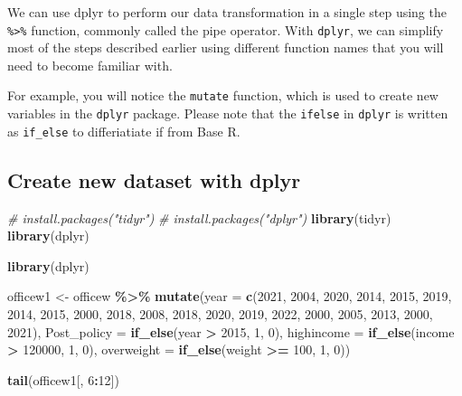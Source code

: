 \documentclass[
]{article}
\newenvironment{Shaded}{\begin{snugshade}}{\end{snugshade}}
\newcommand{\AttributeTok}[1]{\textcolor[rgb]{0.13,0.29,0.53}{#1}}
\newcommand{\CommentTok}[1]{\textcolor[rgb]{0.56,0.35,0.01}{\textit{#1}}}
\newcommand{\DecValTok}[1]{\textcolor[rgb]{0.00,0.00,0.81}{#1}}
\newcommand{\FunctionTok}[1]{\textcolor[rgb]{0.13,0.29,0.53}{\textbf{#1}}}
\newcommand{\NormalTok}[1]{#1}
\newcommand{\OtherTok}[1]{\textcolor[rgb]{0.56,0.35,0.01}{#1}}
\newcommand{\SpecialCharTok}[1]{\textcolor[rgb]{0.81,0.36,0.00}{\textbf{#1}}}
\begin{document}
We can use dplyr to perform our data transformation in a single step
using the \texttt{\%\textgreater{}\%} function, commonly called the pipe
operator. With \texttt{dplyr}, we can simplify most of the steps
described earlier using different function names that you will need to
become familiar with.

For example, you will notice the \texttt{mutate} function, which is used
to create new variables in the \texttt{dplyr} package. Please note that
the \texttt{ifelse} in \texttt{dplyr} is written as \texttt{if\_else} to
differiatiate if from Base R.

\hypertarget{create-new-dataset-with-dplyr}{%
\subsection{Create new dataset with
dplyr}\label{create-new-dataset-with-dplyr}}

\begin{Shaded}
\begin{Highlighting}[]
\CommentTok{\# install.packages("tidyr")}
\CommentTok{\# install.packages("dplyr")}
\FunctionTok{library}\NormalTok{(tidyr)}
\FunctionTok{library}\NormalTok{(dplyr)}

\FunctionTok{library}\NormalTok{(dplyr)}

\NormalTok{officew1 }\OtherTok{\textless{}{-}}\NormalTok{ officew }\SpecialCharTok{\%\textgreater{}\%}
  \FunctionTok{mutate}\NormalTok{(}\AttributeTok{year =} \FunctionTok{c}\NormalTok{(}\DecValTok{2021}\NormalTok{, }\DecValTok{2004}\NormalTok{, }\DecValTok{2020}\NormalTok{, }\DecValTok{2014}\NormalTok{, }\DecValTok{2015}\NormalTok{, }\DecValTok{2019}\NormalTok{, }\DecValTok{2014}\NormalTok{, }\DecValTok{2015}\NormalTok{, }\DecValTok{2000}\NormalTok{, }\DecValTok{2018}\NormalTok{, }
                  \DecValTok{2008}\NormalTok{, }\DecValTok{2018}\NormalTok{, }\DecValTok{2020}\NormalTok{, }\DecValTok{2019}\NormalTok{, }\DecValTok{2022}\NormalTok{, }\DecValTok{2000}\NormalTok{, }\DecValTok{2005}\NormalTok{, }\DecValTok{2013}\NormalTok{, }\DecValTok{2000}\NormalTok{, }\DecValTok{2021}\NormalTok{),}
         \AttributeTok{Post\_policy =} \FunctionTok{if\_else}\NormalTok{(year }\SpecialCharTok{\textgreater{}} \DecValTok{2015}\NormalTok{, }\DecValTok{1}\NormalTok{, }\DecValTok{0}\NormalTok{),}
         \AttributeTok{highincome =} \FunctionTok{if\_else}\NormalTok{(income }\SpecialCharTok{\textgreater{}} \DecValTok{120000}\NormalTok{, }\DecValTok{1}\NormalTok{, }\DecValTok{0}\NormalTok{),}
         \AttributeTok{overweight =} \FunctionTok{if\_else}\NormalTok{(weight }\SpecialCharTok{\textgreater{}=} \DecValTok{100}\NormalTok{, }\DecValTok{1}\NormalTok{, }\DecValTok{0}\NormalTok{))}


\FunctionTok{tail}\NormalTok{(officew1[, }\DecValTok{6}\SpecialCharTok{:}\DecValTok{12}\NormalTok{])}
\end{Highlighting}
\end{Shaded}
\end{document}
